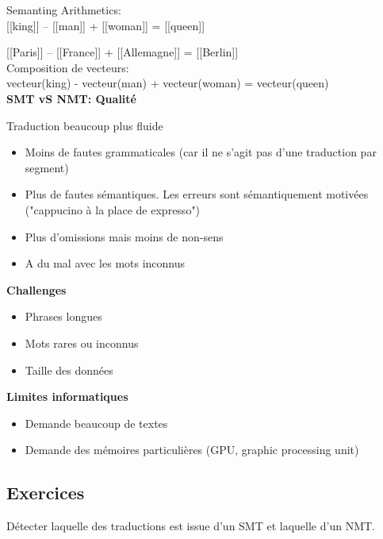 Semanting Arithmetics: \\

[[king]] – [[man]] + [[woman]] = [[queen]]

[[Paris]] – [[France]] + [[Allemagne]] = [[Berlin]]\\

Composition de vecteurs: \\

vecteur(king) - vecteur(man) + vecteur(woman) = vecteur(queen)\\

\textbf{SMT vS NMT: Qualité}

Traduction beaucoup plus fluide

\begin{itemize}
    \item Moins de fautes grammaticales (car il ne s'agit pas d'une traduction par segment)
    \item Plus de fautes sémantiques. Les erreurs sont sémantiquement motivées ("cappucino à la place de expresso")
    \item Plus d'omissions mais moins de non-sens
    \item A du mal avec les mots inconnus\\
\end{itemize}

\textbf{Challenges}

\begin{itemize}
    \item Phrases longues
    \item Mots rares ou inconnus
    \item Taille des données\\
\end{itemize}

\textbf{Limites informatiques}

\begin{itemize}
    \item Demande beaucoup de textes
    \item Demande des mémoires particulières (GPU, graphic processing unit)\\
\end{itemize}

\subsection{Exercices}

Détecter laquelle des traductions est issue d'un SMT et laquelle d'un NMT.\\

